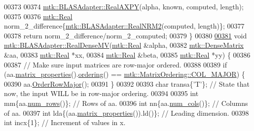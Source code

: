 \begin{DoxyCode}
00373 
00374   \hyperlink{classmtk_1_1BLASAdapter_a081cd092ae65e730f44eae8643edd539}{mtk::BLASAdapter::RealAXPY}(alpha, known, computed, length);
00375 
00376   \hyperlink{group__c01-roots_gac080bbbf5cbb5502c9f00405f894857d}{mtk::Real} norm\_2\_difference\{\hyperlink{classmtk_1_1BLASAdapter_ab92440888b730863244c5d9479c11aca}{mtk::BLASAdapter::RealNRM2}(computed, 
      length)\};
00377 
00378   \textcolor{keywordflow}{return} norm\_2\_difference/norm\_2\_computed;
00379 \}
00380 
\hypertarget{mtk__blas__adapter_8cc_source_l00381}{}\hyperlink{classmtk_1_1BLASAdapter_afdcac059a4294287cb55638221220646}{00381} \textcolor{keywordtype}{void} \hyperlink{classmtk_1_1BLASAdapter_afdcac059a4294287cb55638221220646}{mtk::BLASAdapter::RealDenseMV}(\hyperlink{group__c01-roots_gac080bbbf5cbb5502c9f00405f894857d}{mtk::Real} &alpha,
00382                                    \hyperlink{classmtk_1_1DenseMatrix}{mtk::DenseMatrix} &aa,
00383                                    \hyperlink{group__c01-roots_gac080bbbf5cbb5502c9f00405f894857d}{mtk::Real} *xx,
00384                                    \hyperlink{group__c01-roots_gac080bbbf5cbb5502c9f00405f894857d}{mtk::Real} &beta,
00385                                    \hyperlink{group__c01-roots_gac080bbbf5cbb5502c9f00405f894857d}{mtk::Real} *yy) \{
00386 
00387   \textcolor{comment}{// Make sure input matrices are row-major ordered.}
00388 
00389   \textcolor{keywordflow}{if} (aa.\hyperlink{classmtk_1_1DenseMatrix_a5aa83a0643f27a4652ea97630edf7143}{matrix\_properties}().\hyperlink{classmtk_1_1Matrix_a13cd17621652cd5551ff98549bd94df7}{ordering}() == 
      \hyperlink{namespacemtk_ga622801bd9f912d0f976c3e383f5f581ca34d2765ffc490951febdcca04bc4f7cd}{mtk::MatrixOrdering::COL\_MAJOR}) \{
00390     aa.\hyperlink{classmtk_1_1DenseMatrix_ac2949efba3e8278335d45418c85433e4}{OrderRowMajor}();
00391   \}
00392 
00393   \textcolor{keywordtype}{char} transa\{\textcolor{charliteral}{'T'}\}; \textcolor{comment}{// State that now, the input WILL be in row-major ordering.}
00394 
00395   \textcolor{keywordtype}{int} mm\{aa.\hyperlink{classmtk_1_1DenseMatrix_a53f3afb3b6a8d21854458aaa9663cc74}{num\_rows}()\};                  \textcolor{comment}{// Rows of aa.}
00396   \textcolor{keywordtype}{int} nn\{aa.\hyperlink{classmtk_1_1DenseMatrix_a41747502d468c6728a4be31501b16e0e}{num\_cols}()\};                  \textcolor{comment}{// Columns of aa.}
00397   \textcolor{keywordtype}{int} lda\{(aa.\hyperlink{classmtk_1_1DenseMatrix_a5aa83a0643f27a4652ea97630edf7143}{matrix\_properties}()).ld()\}; \textcolor{comment}{// Leading dimension.}
00398   \textcolor{keywordtype}{int} incx\{1\};                            \textcolor{comment}{// Increment of values in x.}

\end{DoxyCode}
